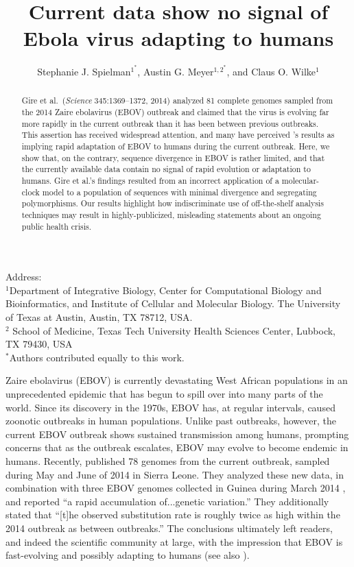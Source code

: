 \documentclass[11pt]{article}
\title{Current data show no signal of Ebola virus adapting to humans}
\author{Stephanie J. Spielman$^{1^\ast}$, Austin G. Meyer$^{1,2^\ast}$, and Claus O. Wilke$^{1}$}
\begin{document}
\maketitle
\maketitle
\noindent
Address:\\
$^1$Department of Integrative Biology, Center for Computational Biology and Bioinformatics, and Institute of Cellular and Molecular Biology.
The University of Texas at Austin, Austin, TX 78712, USA.\\
$^2$ School of Medicine, Texas Tech University Health Sciences Center, Lubbock, TX 79430, USA \\
$^\ast$Authors contributed equally to this work.


\begin{abstract}
Gire et al.\ (\emph{Science} 345:1369--1372, 2014) analyzed 81 complete genomes sampled from the 2014 Zaire ebolavirus (EBOV) outbreak and claimed that the virus is evolving far more rapidly in the current outbreak than it has been between previous outbreaks. This assertion has received widespread attention, and many have perceived \citet{Gire2014}'s results as implying rapid adaptation of EBOV to humans during the current outbreak. Here, we show that, on the contrary, sequence divergence in EBOV is rather limited, and that the currently available data contain no signal of rapid evolution or adaptation to humans. Gire et al.'s findings resulted from an incorrect application of a molecular-clock model to a population of sequences with minimal divergence and segregating polymorphisms. Our results highlight how indiscriminate use of off-the-shelf analysis techniques may result in highly-publicized, misleading statements about an ongoing public health crisis. 
\end{abstract}

\noindent
Zaire ebolavirus (EBOV) is currently devastating West African populations in an unprecedented epidemic that has begun to spill over into many parts of the world. Since its discovery in the 1970s, EBOV has, at regular intervals, caused zoonotic outbreaks in human populations. Unlike past outbreaks, however, the current EBOV outbreak shows sustained transmission among humans, prompting concerns that as the outbreak escalates, EBOV may evolve to become endemic in humans. Recently, \citet{Gire2014} published 78 genomes from the current outbreak, sampled during May and June of 2014 in Sierra Leone. They analyzed these new data, in combination with three EBOV genomes collected in Guinea during March 2014 \citep{Baizeetal2014}, and reported ``a rapid accumulation of...genetic variation.'' They additionally stated that ``[t]he observed substitution rate is roughly twice as high within the 2014 outbreak as between outbreaks.'' The conclusions ultimately left readers, and indeed the scientific community at large, with the impression that EBOV is fast-evolving and possibly adapting to humans (see also \citealt{NatureEditorial,Lukszaetal2014}). 
\end{document}
